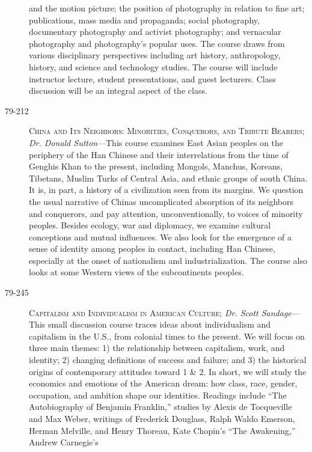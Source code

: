 \begin{description}
        and the motion picture; the position of photography in relation to fine
        art; publications, mass media and propaganda; social photography,
        documentary photography and activist photography; and vernacular
        photography and photography's popular uses. The course draws from
        various disciplinary perspectives including art history, anthropology,
        history, and science and technology studies. The course will include
        instructor lecture, student presentations, and guest lecturers. Class
        discussion will be an integral aspect of the class.
    \item [79-212] \textsc{China and Its Neighbors: Minorities, Conquerors, and Tribute
        Bearers}; \textit{Dr. Donald Sutton}---This course examines East Asian
        peoples on the periphery of the Han Chinese and their interrelations
        from the time of Genghis Khan to the present, including Mongols,
        Manchus, Koreans, Tibetans, Muslim Turks of Central Asia, and ethnic
        groups of south China. It is, in part, a history of a civilization seen
        from its margins. We question the usual narrative of Chinas
        uncomplicated absorption of its neighbors and conquerors, and pay
        attention, unconventionally, to voices of minority peoples. Besides
        ecology, war and diplomacy, we examine cultural conceptions and mutual
        influences. We also look for the emergence of a sense of identity among
        peoples in contact, including Han Chinese, especially at the onset of
        nationalism and industrialization. The course also looks at some Western
        views of the subcontinents peoples.
    \item [79-245] \textsc{Capitalism and Individualism in American Culture};
        \textit{Dr. Scott Sandage}---This small discussion course traces ideas
        about individualism and capitalism in the U.S., from colonial times to
        the present. We will focus on three main themes: 1) the relationship
        between capitalism, work, and identity; 2) changing definitions of
        success and failure; and 3) the historical origins of contemporary
        attitudes toward 1 \& 2. In short, we will study the economics and
        emotions of the American dream: how class, race, gender, occupation, and
        ambition shape our identities.  Readings include ``The Autobiography of
        Benjamin Franklin,'' studies by Alexis de Tocqueville and Max Weber,
        writings of Frederick Douglass, Ralph Waldo Emerson, Herman Melville,
        and Henry Thoreau, Kate Chopin's ``The Awakening,'' Andrew Carnegie's

\end{description}
